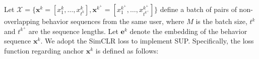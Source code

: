 \documentclass{article}
\begin{document}
Let $\mathcal{X} = \{\bm{x}^k=[x_{1}^k,\ldots,x_{t^k}^k], \bm{x}^{k^+}=[x_{1}^{k^+},\ldots,x_{t^{k^+}}^{k^+}] \} $ define a batch of pairs of non-overlapping behavior sequences from the same user, where $M$ is the batch size, $t^k$ and $t^{k^+}$ are the sequence lengths. Let $\bm{e}^k$ denote the embedding of the behavior sequence $\bm{x}^k$. 
We adopt the SimCLR \citep{simclr} loss to implement SUP. Specifically, the loss function regarding anchor $\bm{x}^k$ is defined as follows:
\end{document}
